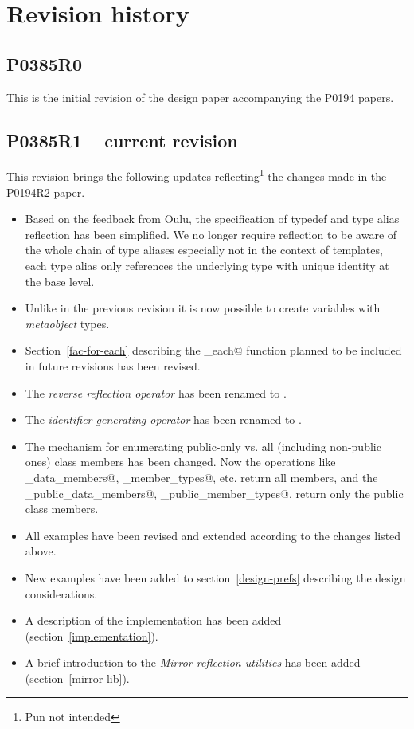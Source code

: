 \section{Revision history}

\subsection{P0385R0}

This is the initial revision of the design paper accompanying the P0194 papers.

\subsection{P0385R1 -- current revision}

This revision brings the following updates reflecting\footnote{Pun not intended}
the changes made in the P0194R2 paper.

\begin{itemize}
\item Based on the feedback from Oulu, the specification of typedef and
type alias reflection has been simplified. We no longer require reflection
to be aware of the whole chain of type aliases especially not in the context
of templates, each type alias only references the underlying type with unique
identity at the base level.
\item Unlike in the previous revision it is now possible to create variables
with {\em metaobject} types.
\item Section~\ref{fac-for-each} describing the \verb@for_each@ function
planned to be included in future revisions has been revised.
\item The {\em reverse reflection operator} has been renamed to \verb@unreflexpr@.
\item The {\em identifier-generating operator} has been renamed to \verb@idreflexpr@.
\item The mechanism for enumerating public-only vs. all (including non-public ones)
class members has been changed. Now the  operations like
\verb@get_data_members@, \verb@get_member_types@, etc.
return all members, and the \verb@get_public_data_members@,
\verb@get_public_member_types@, return only the public class members.
\item All examples have been revised and extended according to the changes listed above.
\item New examples have been added to section~\ref{design-prefs} describing
the design considerations.
\item A description of the implementation has been added (section~\ref{implementation}).
\item A brief introduction to the {\em Mirror reflection utilities} has been added
(section~\ref{mirror-lib}).
\end{itemize}

